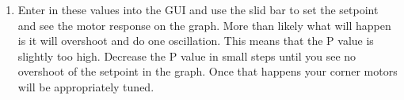 \documentclass[12pt]{article}
\begin{document}
\begin{enumerate}
	\item Enter in these values into the GUI and use the slid bar to set the setpoint and see the motor response on the graph. More than likely what will happen is it will overshoot and do one oscillation. This means that the P value is slightly too high. Decrease the P value in small steps until you see no overshoot of the setpoint in the graph. Once that happens your corner motors will be appropriately tuned. 

\end{enumerate}
\end{document}
